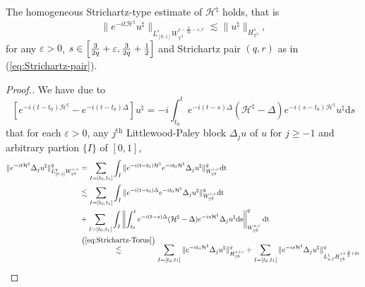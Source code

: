 \begin{lem}
  \label{lem:Strichartz-AH-low} The homogeneous Strichartz-type estimate
  of $\mathcal{H}^{\natural}$ holds, that is
  \begin{equation}
    \| e^{- i t \mathcal{H}^{\natural}} u^{\natural} \|_{L_{[0, 1]}^{^q}
    W_{\mathbb{T}^3}^{s - \frac{3}{2 q} - \varepsilon, r}} \lesssim \|
    u^{\natural} \|_{H_{\mathbb{T}^3}^s}, \label{eq:AH-Strichartz-low}
  \end{equation}
for any $\varepsilon > 0$, $s \in \left[
  \frac{3}{2 q} + \varepsilon, {\color[HTML]{000000}\frac{3}{2 q} +
  \frac{1}{2}} \right]$ and Strichartz pair $(q, r)$ as in
  (\ref{eq:Strichartz-pair}).
\end{lem}
\begin{proof}[Proof.]
We have due to
  \[ 
  \left[e^{- i (t - t_0) \mathcal{H}^{\natural}} - e^{- i (t - t_0) \Delta}\right]
     u^{\natural} = - i \int^t_{t_0} e^{- i (t - s) \Delta}
     (\mathcal{H}^{\natural} - \Delta) e^{- i (s - t_0)
     \mathcal{H}^{\natural}} u^{\natural} \mathrm{d}s 
     \]
  that for each $\varepsilon > 0$, any $j^{\mathrm{th}}$ Littlewood-Paley block
  $\Delta_j u$ of $u$ for $j \geqslant - 1$ and arbitrary partion $\{ I \}$ of
  $[0, 1]$,
  \begin{equation*}
  \begin{split}
    \|e^{- i t \mathcal{H}^{\natural}} \Delta_j u^{\natural} \|^q_{L_{[0,
    1]}^q W_{\mathbb{T}^3}^{s, r}}  & = {\sum_{I = [t_0, t_1]}}  \int_I \|
    e^{- i (t - t_0) \mathcal{H}^{\natural}} e^{- i t_0
    \mathcal{H}^{\natural}} \Delta_j u^{\natural} \|^q_{W_{\mathbb{T}^3}^{s,
    r}} \mathrm{dt}\\
    & \lesssim {\sum_{I = [t_0, t_1]}}  \int_I \| e^{- i (t - t_0) \Delta}
    e^{- i t_0 \mathcal{H}^{\natural}} \Delta_j u^{\natural}
    \|^q_{W_{\mathbb{T}^3}^{s, r}} \mathrm{dt}\\
    &   + {\sum_{I = [t_0, t_1]}}  \int_I \left\| \int^t_{t_0} e^{- i (t -
    s) \Delta} (\mathcal{H}^{\natural} - \Delta) e^{- i s
    \mathcal{H}^{\natural}} \Delta_j u^{\natural} \mathrm{ds}
    \right\|^q_{W_{\mathbb{T}^3}^{s, r}} \mathrm{dt}\\
    & \overset{\left( \ref{eq:Strichartz-Torus} \right)}{\lesssim}  \sum_{I
    = [t_0, t_1]} \| e^{- i t_0 \mathcal{H}^{\natural}} \Delta_j u^{\natural}
    \|^q_{H_{\mathbb{T}^3}^{s + \varepsilon}} + \sum_{I = [t_0, t_1]} \| e^{-
    i s \mathcal{H}^{\natural}} \Delta_j u^{\natural} \|^q_{ L_{s ; I}^1
    H_{\mathbb{T}^3}^{s + \frac{3}{2} + 2 \varepsilon}}\\

\end{split}
\end{equation*}
\end{proof}
